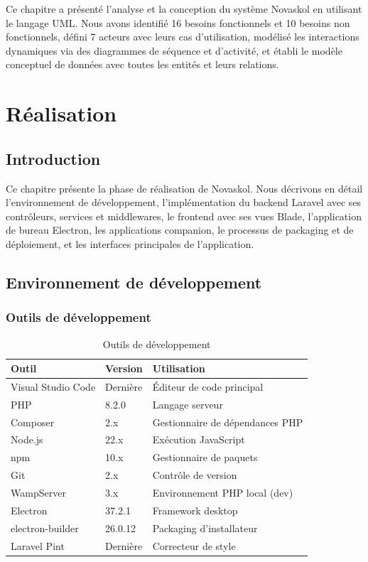 \documentclass[12pt,a4paper,twoside]{report}
\begin{document}
Ce chapitre a présenté l'analyse et la conception du système Novaskol en utilisant le langage UML. Nous avons identifié 16 besoins fonctionnels et 10 besoins non fonctionnels, défini 7 acteurs avec leurs cas d'utilisation, modélisé les interactions dynamiques via des diagrammes de séquence et d'activité, et établi le modèle conceptuel de données avec toutes les entités et leurs relations.

\chapter{Réalisation}

\section{Introduction}

Ce chapitre présente la phase de réalisation de Novaskol. Nous décrivons en détail l'environnement de développement, l'implémentation du backend Laravel avec ses contrôleurs, services et middlewares, le frontend avec ses vues Blade, l'application de bureau Electron, les applications companion, le processus de packaging et de déploiement, et les interfaces principales de l'application.

\section{Environnement de développement}

\subsection{Outils de développement}

\begin{table}[h]
\centering
\caption{Outils de développement}
\begin{tabular}{lll}
\toprule
Outil & Version & Utilisation \\
\midrule
Visual Studio Code & Dernière & Éditeur de code principal \\
PHP & 8.2.0 & Langage serveur \\
Composer & 2.x & Gestionnaire de dépendances PHP \\
Node.js & 22.x & Exécution JavaScript \\
npm & 10.x & Gestionnaire de paquets \\
Git & 2.x & Contrôle de version \\
WampServer & 3.x & Environnement PHP local (dev) \\
Electron & 37.2.1 & Framework desktop \\
electron-builder & 26.0.12 & Packaging d'installateur \\
Laravel Pint & Dernière & Correcteur de style \\
\bottomrule
\end{tabular}
\end{table}
\end{document}
